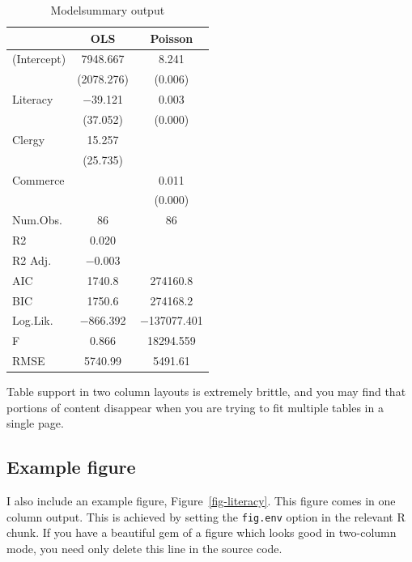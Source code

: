\documentclass[
  Afour,
  times,
  sageh]{sagej}
\begin{document}
\hypertarget{tbl-modelsummary}{}
\begin{table}
\caption{\label{tbl-modelsummary}Modelsummary output }\tabularnewline

\centering
\begin{tabular}[t]{lcc}
\toprule
  & OLS & Poisson\\
\midrule
(Intercept) & \num{7948.667} & \num{8.241}\\
 & (\num{2078.276}) & (\num{0.006})\\
Literacy & \num{-39.121} & \num{0.003}\\
 & (\num{37.052}) & (\num{0.000})\\
Clergy & \num{15.257} & \\
 & (\num{25.735}) & \\
Commerce &  & \num{0.011}\\
 &  & (\num{0.000})\\
\midrule
Num.Obs. & \num{86} & \num{86}\\
R2 & \num{0.020} & \\
R2 Adj. & \num{-0.003} & \\
AIC & \num{1740.8} & \num{274160.8}\\
BIC & \num{1750.6} & \num{274168.2}\\
Log.Lik. & \num{-866.392} & \num{-137077.401}\\
F & \num{0.866} & \num{18294.559}\\
RMSE & \num{5740.99} & \num{5491.61}\\
\bottomrule
\end{tabular}
\end{table}

Table support in two column layouts is extremely brittle, and you may
find that portions of content disappear when you are trying to fit
multiple tables in a single page.

\hypertarget{example-figure}{%
\subsection{Example figure}\label{example-figure}}

I also include an example figure, Figure~\ref{fig-literacy}. This figure
comes in one column output. This is achieved by setting the
\texttt{fig.env} option in the relevant R chunk. If you have a beautiful
gem of a figure which looks good in two-column mode, you need only
delete this line in the source code.
\end{document}
